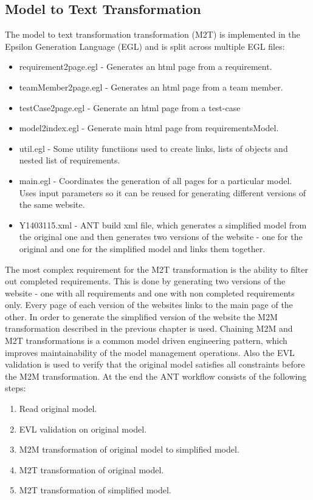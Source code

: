\documentclass[11pt,a4paper]{article}
\begin{document}
	\subsection{Model to Text Transformation}
	The model to text transformation transformation (M2T) is implemented in the Epsilon Generation Language (EGL) \cite{egl} and is split across multiple EGL files:
	
	\begin{itemize}[noitemsep]	
		\item requirement2page.egl - Generates an html page from a requirement.
		\item teamMember2page.egl  - Generates an html page from a team member.
		\item testCase2page.egl - Generate an html page from a test-case
		\item model2index.egl - Generate main html page from requirementsModel.
		\item util.egl - Some utility functiions used to create links, lists of objects and nested list of requirements.
		\item main.egl - Coordinates the generation of all pages for a particular model. Uses input parameters so it can be reused for generating different versions of the same website.
		\item Y1403115.xml - ANT \cite{ant} build xml file, which generates a simplified model from the original one and then generates two versions of the website - one for the original and one for the simplified model and links them together.
	\end{itemize}

	The most complex requirement for the M2T transformation is the ability to filter out completed requirements. This is done by generating two versions of the website - one with all requirements and one with non completed requirements only. Every page of each version of the websites links to the main page of the other. In order to generate the simplified version of the website the M2M transformation described in the previous chapter is used. Chaining M2M and M2T transformations is a common model driven engineering pattern, which improves maintainability of the model management operations. Also the EVL validation is used to verify that the original model satisfies all constraints before the M2M transformation. At the end the ANT workflow consists of the following steps:
	
	\begin{enumerate}[noitemsep]
		\item Read original model.
		\item EVL validation on original model.
		\item M2M transformation of original model to simplified model.
		\item M2T transformation of original model.
		\item M2T transformation of simplified model.
	\end{enumerate}
	
\end{document}
